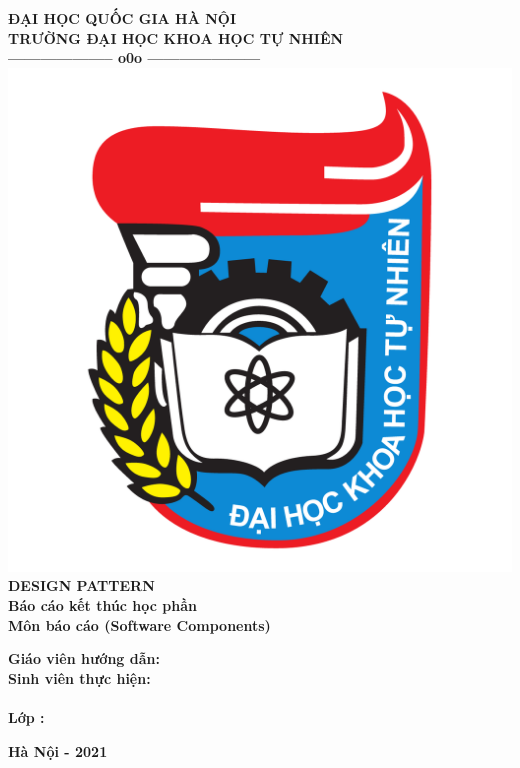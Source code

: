 \thispagestyle{empty}
\thisfancypage{
	\setlength{\fboxsep}{5pt}
	\shadowbox}{}

\begin{center}
	
	{\fontsize{13pt}{1}\selectfont\textbf{ĐẠI HỌC QUỐC GIA HÀ NỘI}}
	\\
	{\fontsize{13pt}{1}\selectfont\textbf{TRƯỜNG ĐẠI HỌC KHOA HỌC TỰ NHIÊN}}
	\\	
	\textbf{--------------------  o0o  ---------------------}\\[1cm]
	\includegraphics[scale=0.25]{GALLEYS/Logo-DH-Khoa-Hoc-Tu-Nhien-Ha-Noi-VNU-HUS.png} \\[1.2cm]
	\textbf{{\Huge DESIGN PATTERN}}
\textbf{}\\[1cm]
\textbf{{\large  Báo cáo kết thúc học phần}}\\[0.2cm]
\textbf{{\large Môn báo cáo (Software Components)}}\\[1cm]
\end{center}
\begin{flushleft}
\hspace{1.5 cm} \textbf{ Giáo viên hướng dẫn:\hspace{0.4cm}{Quản Thái Hà}}\\[0.2cm]
\hspace{1.5 cm} \textbf{ Sinh viên thực hiện\hspace{0.3cm}:\hspace{0.2cm}{ Lê Quang Trường- 20180129}}\\[0.2cm]
\hspace{1.5 cm} \textbf{\hspace{4.9cm}{ Lê Quang Trường- 20180129}}\\[0.2cm]
\hspace{1.7 cm} \textbf{Lớp\hspace{0.3 cm} \hspace{3.1cm}: \hspace{0.2 cm}{Máy tính và Khoa học thông tin ClC }}
\end{flushleft}

\vspace{1.0cm}
\begin{center}
\textbf{{\large Hà Nội - 2021}}\\
\end{center}